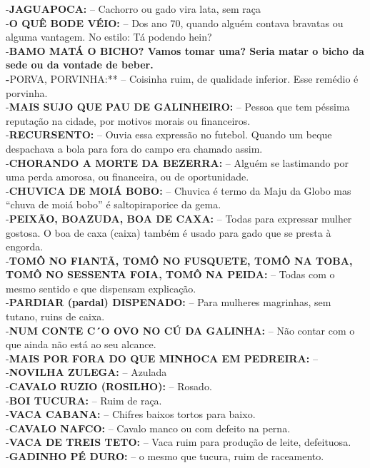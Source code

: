 \documentclass[12pt,brazil,]{book}
\begin{document}
-\textbf{JAGUAPOCA:} -- Cachorro ou gado vira lata, sem raça\\
-\textbf{O QUÊ BODE VÉIO:} -- Dos ano 70, quando alguém contava bravatas
ou alguma vantagem. No estilo: Tá podendo hein?\\
-\textbf{BAMO MATÁ O BICHO? Vamos tomar uma? Seria matar o bicho da sede
ou da vontade de beber.\\
-}PORVA, PORVINHA:** -- Coisinha ruim, de qualidade inferior. Esse
remédio é porvinha.\\
-\textbf{MAIS SUJO QUE PAU DE GALINHEIRO:} -- Pessoa que tem péssima
reputação na cidade, por motivos morais ou financeiros.\\
-\textbf{RECURSENTO:} -- Ouvia essa expressão no futebol. Quando um
beque despachava a bola para fora do campo era chamado assim.\\
-\textbf{CHORANDO A MORTE DA BEZERRA:} -- Alguém se lastimando por uma
perda amorosa, ou financeira, ou de oportunidade.\\
-\textbf{CHUVICA DE MOIÁ BOBO:} -- Chuvica é termo da Maju da Globo mas
``chuva de moiá bobo'' é saltopiraporice da gema.\\
-\textbf{PEIXÃO, BOAZUDA, BOA DE CAXA:} -- Todas para expressar mulher
gostosa. O boa de caxa (caixa) também é usado para gado que se presta à
engorda.\\
-\textbf{TOMÔ NO FIANTÃ, TOMÔ NO FUSQUETE, TOMÔ NA TOBA, TOMÔ NO
SESSENTA FOIA, TOMÔ NA PEIDA:} -- Todas com o mesmo sentido e que
dispensam explicação.\\
-\textbf{PARDIAR (pardal) DISPENADO:} -- Para mulheres magrinhas, sem
tutano, ruins de caixa.\\
-\textbf{NUM CONTE C´O OVO NO CÚ DA GALINHA:} -- Não contar com o que
ainda não está ao seu alcance.\\
-\textbf{MAIS POR FORA DO QUE MINHOCA EM PEDREIRA:} --\\
-\textbf{NOVILHA ZULEGA:} -- Azulada\\
-\textbf{CAVALO RUZIO (ROSILHO):} -- Rosado.\\
-\textbf{BOI TUCURA:} -- Ruim de raça.\\
-\textbf{VACA CABANA:} -- Chifres baixos tortos para baixo.\\
-\textbf{CAVALO NAFCO:} -- Cavalo manco ou com defeito na perna.\\
-\textbf{VACA DE TREIS TETO:} -- Vaca ruim para produção de leite,
defeituosa.\\
-\textbf{GADINHO PÉ DURO:} -- o mesmo que tucura, ruim de raceamento.\\
\end{document}
